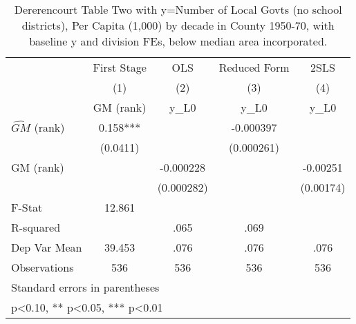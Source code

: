 \begin{table}[htbp]\centering
\def\sym#1{\ifmmode^{#1}\else\(^{#1}\)\fi}
\caption{Dererencourt Table Two with y=Number of Local Govts (no school districts), Per Capita (1,000) by decade in County 1950-70, with baseline y and division FEs, below median area incorporated.}
\begin{tabular}{l*{4}{c}}
\toprule
                    & First Stage   &         OLS   &Reduced Form   &        2SLS   \\
                    &\multicolumn{1}{c}{(1)}&\multicolumn{1}{c}{(2)}&\multicolumn{1}{c}{(3)}&\multicolumn{1}{c}{(4)}\\
                    &\multicolumn{1}{c}{GM  (rank)}&\multicolumn{1}{c}{y\_L0}&\multicolumn{1}{c}{y\_L0}&\multicolumn{1}{c}{y\_L0}\\
\midrule
$\hat{GM}$ (rank)   &       0.158***&               &   -0.000397   &               \\
                    &    (0.0411)   &               &  (0.000261)   &               \\
\addlinespace
GM  (rank)          &               &   -0.000228   &               &    -0.00251   \\
                    &               &  (0.000282)   &               &   (0.00174)   \\
\midrule
F-Stat              &      12.861   &               &               &               \\
R-squared           &               &        .065   &        .069   &               \\
Dep Var Mean        &      39.453   &        .076   &        .076   &        .076   \\
Observations        &         536   &         536   &         536   &         536   \\
\bottomrule
\multicolumn{5}{l}{\footnotesize Standard errors in parentheses}\\
\multicolumn{5}{l}{\footnotesize * p<0.10, ** p<0.05, *** p<0.01}\\
\end{tabular}
\end{table}
